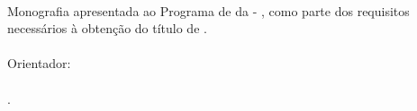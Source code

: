%
%

\makeatletter
\begin{folhadeaprovacao}

\thispagestyle{empty}%
	
	\begin{center}
    
		\small\textbf{\expandafter\uppercase\expandafter{\imprimirnomeautor}}\\
		\vspace*{3.0 cm}%
		\normalsize\textbf{\expandafter\uppercase\expandafter{\imprimirtitulotb}}
		
    \end{center}
	
	\vspace*{0.35 cm}%
		    \large%
    		\hfill%
	    	\begin{minipage}{8 cm}%
	    		\begin{small} %
	    		\setlength{\baselineskip}{0.7\baselineskip}
				
		    	{Monografia apresentada ao Programa de {\imprimirprograma }
		    	{\imprimirmodalidade} da {\imprimirinstituicao}{ - }{\imprimirdepartamento},
		    	como parte dos requisitos necessários à obtenção do título de
		    	{\imprimirgrau }.}\\{
		    	}\vspace*{0.6 cm}\\Orientador:\\ \\
		    	{\imprimirtitulacaoorientador }{ }{\imprimirorientador.}\\{
		    	}\\ %
				
				\end{small} %
		    \end{minipage}%
		    	
		    \vspace{0.01 cm}%
		    
		    \large%
    		\hfill%
	    	 
		    
		    \normalsize %
		    \vspace{0.01 cm}%
		    

\end{folhadeaprovacao}
